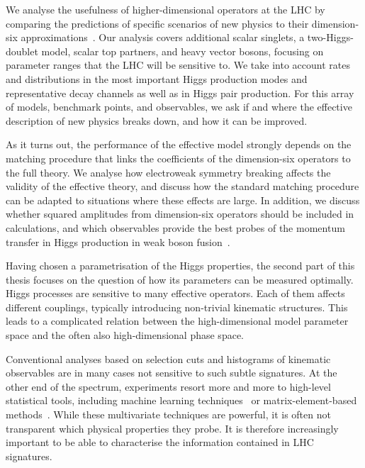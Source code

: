 We analyse the usefulness of higher-dimensional operators at the LHC
by comparing the predictions of specific scenarios of new physics to
their dimension-six approximations~\cite{Brehmer:2015rna}. Our
analysis covers additional scalar singlets, a two-Higgs-doublet model,
scalar top partners, and heavy vector bosons, focusing on parameter
ranges that the LHC will be sensitive to. We take into account rates
and distributions in the most important Higgs production modes and
representative decay channels as well as in Higgs pair production. For
this array of models, benchmark points, and observables, we ask if and
where the effective description of new physics breaks down, and how it
can be improved.

As it turns out, the performance of the effective model strongly
depends on the matching procedure that links the coefficients of the
dimension-six operators to the full theory. We analyse how electroweak
symmetry breaking affects the validity of the effective theory, and
discuss how the standard matching procedure can be adapted to
situations where these effects are large. In addition, we discuss
whether squared amplitudes from dimension-six operators should be
included in calculations, and which observables provide the best
probes of the momentum transfer in Higgs production in weak boson
fusion~\cite{Biekotter:2016ecg}.

\newparagraph
%
Having chosen a parametrisation of the Higgs properties, the second part
of this thesis focuses on the question of how its parameters can be
measured optimally. Higgs processes are sensitive to many effective
operators. Each of them affects different couplings, typically
introducing non-trivial kinematic structures. This leads to a
complicated relation between the high-dimensional model parameter
space and the often also high-dimensional phase space.

Conventional analyses based on selection cuts and histograms of
kinematic observables are in many cases not sensitive to such subtle
signatures.  At the other end of the spectrum, experiments resort more
and more to high-level statistical tools, including machine learning
techniques~\cite{Cranmer:2015bka, Louppe:2016ylz, Louppe:2016aov,
  Cranmer:2016lzt, Baldi:2016fzo, Brehmer:ghost_probability,
  Cogan:2014oua, Baldi:2014pta, deOliveira:2015xxd, Almeida:2015jua,
  Baldi:2016fql, Guest:2016iqz, Komiske:2016rsd, Kasieczka:2017nvn,
  Louppe:2017ipp, Baldi:2014kfa, Searcy:2015apa, Santos:2016kno,
  Alves:2016htj, Buckley:2011kc, Bornhauser:2013aya, Bechtle:2017vyu}
or matrix-element-based methods~\cite{Kondo:1988yd, Abazov:2004cs,
  Gao:2010qx, Alwall:2010cq, Avery:2012um, Andersen:2012kn,
  Campbell:2013hz, Artoisenet:2013vfa, Martini:2015fsa,
  Gritsan:2016hjl, Soper:2011cr, Soper:2012pb, Soper:2014rya,
  Atwood:1991ka, Davier:1992nw, Diehl:1993br}. While these
multivariate techniques are powerful, it is often not transparent
which physical properties they probe. It is therefore increasingly
important to be able to characterise the information contained in LHC
signatures.


